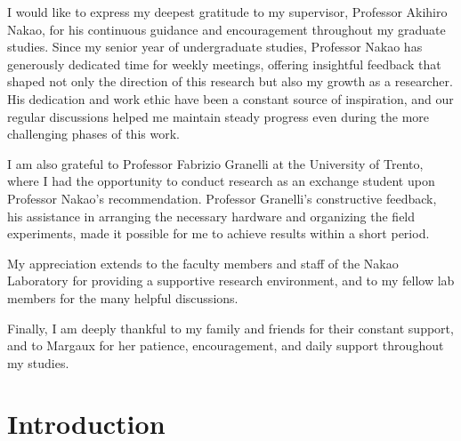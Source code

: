 \documentclass[master,final,11pt]{iscs-thesis}
\date{February 19, 2026}
\begin{document}
\maketitle

\begin{acknowledge}
I would like to express my deepest gratitude to my supervisor, Professor Akihiro Nakao, for his continuous guidance and encouragement throughout my graduate studies. Since my senior year of undergraduate studies, Professor Nakao has generously dedicated time for weekly meetings, offering insightful feedback that shaped not only the direction of this research but also my growth as a researcher. His dedication and work ethic have been a constant source of inspiration, and our regular discussions helped me maintain steady progress even during the more challenging phases of this work.

I am also grateful to Professor Fabrizio Granelli at the University of Trento, where I had the opportunity to conduct research as an exchange student upon Professor Nakao's recommendation. Professor Granelli's constructive feedback, his assistance in arranging the necessary hardware and organizing the field experiments, made it possible for me to achieve results within a short period.

My appreciation extends to the faculty members and staff of the Nakao Laboratory for providing a supportive research environment, and to my fellow lab members for the many helpful discussions.

Finally, I am deeply thankful to my family and friends for their constant support, and to Margaux for her patience, encouragement, and daily support throughout my studies.
\end{acknowledge}

\frontmatter
\tableofcontents
\listoffigures
\listoftables

\mainmatter

\chapter{Introduction}
\label{chap:introduction}

\end{document}
